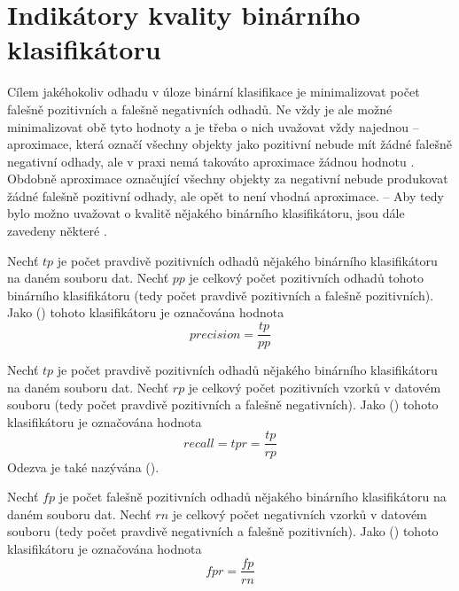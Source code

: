 \section{Indikátory kvality binárního klasifikátoru}\label{quality_indicators}
Cílem jakéhokoliv odhadu v úloze binární klasifikace je minimalizovat počet falešně pozitivních a falešně negativních odhadů. Ne vždy je ale možné minimalizovat obě tyto hodnoty a je třeba o nich uvažovat vždy najednou -- aproximace, která označí všechny objekty jako pozitivní nebude mít žádné falešně negativní odhady, ale v praxi nemá takováto aproximace žádnou hodnotu . Obdobně aproximace označující všechny objekty za negativní nebude produkovat žádné falešně pozitivní odhady, ale opět to není vhodná aproximace. -- Aby tedy bylo možno uvažovat o kvalitě nějakého binárního klasifikátoru, jsou dále zavedeny některé  .


\begin{define}
	Nechť \( tp \) je počet pravdivě pozitivních odhadů nějakého binárního klasifikátoru na daném souboru dat. Nechť \( pp \) je celkový počet pozitivních odhadů tohoto binárního klasifikátoru (tedy počet pravdivě pozitivních a falešně pozitivních). Jako  () tohoto klasifikátoru je označována hodnota
	\[ precision = \frac{tp}{pp} \]
\end{define}

\begin{define}
	Nechť \( tp \) je počet pravdivě pozitivních odhadů nějakého binárního klasifikátoru na daném souboru dat. Nechť \( rp \) je celkový počet pozitivních vzorků v datovém souboru (tedy počet pravdivě pozitivních a falešně negativních). Jako  () tohoto klasifikátoru je označována hodnota
	\[ recall = tpr = \frac{tp}{rp} \]
	Odezva je také nazývána  ().
\end{define}

\begin{define}
	Nechť \( fp \) je počet falešně pozitivních odhadů nějakého binárního klasifikátoru na daném souboru dat. Nechť \( rn \) je celkový počet negativních vzorků v datovém souboru (tedy počet pravdivě negativních a falešně pozitivních). Jako  () tohoto klasifikátoru je označována hodnota
	\[ fpr = \frac{fp}{rn} \]
\end{define}

